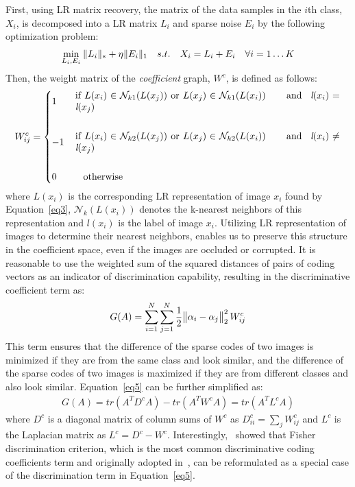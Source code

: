 \documentclass[journal]{IEEEtran}
\DeclarePairedDelimiter\norm{\lVert}{\rVert}
\begin{document}
First, using LR matrix recovery, the matrix of the data samples in the $i$th class, $X_i$, is decomposed into a LR matrix $L_i$ and sparse noise $E_i$ by the following optimization problem:
\begin{gather}
\min_{L_i,E_i} \> \norm{L_i}_{*} + \eta \norm{E_i}_{1} \quad s.t. \quad X_i=L_i+E_i \quad \forall i=1 \dots K
\label{eq3}
\end{gather}
Then, the weight matrix of the \textit{coefficient} graph, $W^c$, is defined as follows:
\begin{gather}
W^c_{ij} = 
\begin{dcases}
   1 & \, \parbox[c]{.8\columnwidth} {if $L(x_i) \in \mathcal N_{k1}(L(x_j))$ or $L(x_j) \in \mathcal N_{k1}(L(x_i))$ \hspace*{0.5cm} and \, $\textit{l}(x_i) = \textit{l}(x_j)$}\\
    \\
  -1  & \, \parbox[c]{.8\columnwidth} {if $L(x_i) \in \mathcal N_{k2}(L(x_j))$ or $L(x_j) \in \mathcal N_{k2}(L(x_i))$ \hspace*{0.5cm} and \, $\textit{l}(x_i) \neq \textit{l}(x_j)$}\\
    \\
    0       & \quad \text{otherwise}\\
\end{dcases}
\label{eq4}
\end{gather}
where $L(x_i)$ is the corresponding LR representation of image $x_i$ found by Equation~\eqref{eq3}, $\mathcal N_{k}(L(x_i))$ denotes the k-nearest neighbors of this representation and $\textit{l}(x_i)$ is the label of image $x_i$. Utilizing LR representation of images to determine their nearest neighbors, enables us to preserve this structure in the coefficient space, even if the images are occluded or corrupted. It is reasonable to use the weighted sum of the squared distances of pairs of coding vectors as an indicator of discrimination capability, resulting in the discriminative coefficient term as:
\begin{gather}
G(A) = \sum\limits_{i=1}^N \sum\limits_{j=1}^N \frac{1}{2} \norm[\big]{\alpha_i - \alpha_j}_{2}^2 \, W^c_{ij}
\label{eq5}
\end{gather}
This term ensures that the difference of the sparse codes of two images is minimized if they are from the same class and look similar, and the difference of the sparse codes of two images is maximized if they are from different classes and also look similar. Equation~\eqref{eq5} can be further simplified as:
\begin{gather}
G(A) = tr(A^T D^c A) - tr(A^T W^c A) = tr(A^T L^c A) 
\label{eq6}
\end{gather}
where $D^c$ is a diagonal matrix of column sums of $W^c$ as $D^c_{ii} = \sum\nolimits_{j} W^c_{ij}$ and $L^c$ is the Laplacian matrix as $L^c = D^c-W^c$. Interestingly,~\cite{SVGDL} showed that Fisher discrimination criterion, which is the most common discriminative coding coefficients term and originally adopted in~\cite{FDDL}, can be reformulated as a special case of the discrimination term in Equation~\eqref{eq5}.
\end{document}
